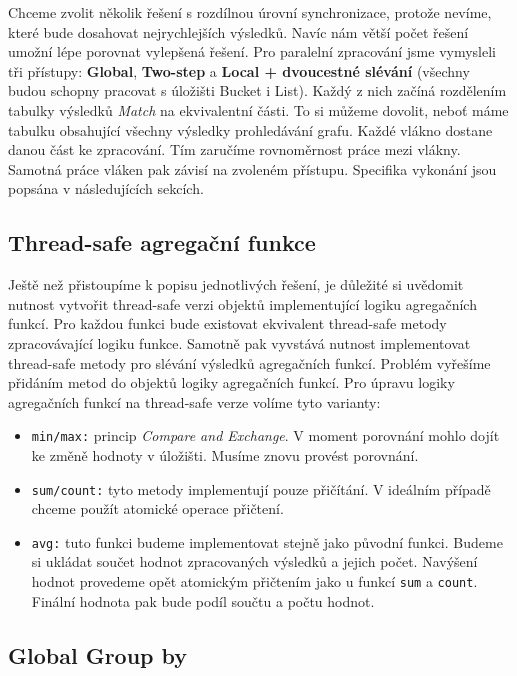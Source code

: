 Chceme zvolit několik řešení s rozdílnou úrovní synchronizace, protože nevíme, které bude dosahovat nejrychlejších výsledků.
Navíc nám větší počet řešení umožní lépe porovnat vylepšená řešení.
Pro paralelní zpracování jsme vymysleli tři přístupy: \textbf{Global}, \textbf{Two-step} a \textbf{Local + dvoucestné slévání} (všechny budou schopny pracovat s úložišti Bucket i List).
Každý z nich začíná rozdělením tabulky výsledků \textit{Match} na ekvivalentní části.
To si můžeme dovolit, neboť máme tabulku obsahující všechny výsledky prohledávání grafu.
Každé vlákno dostane danou část ke zpracování.
Tím zaručíme rovnoměrnost práce mezi vlákny.
Samotná práce vláken pak závisí na zvoleném přístupu.
Specifika vykonání jsou popsána v následujících sekcích.

\subsection{Thread-safe agregační funkce}

Ještě než přistoupíme k popisu jednotlivých řešení, je důležité si uvědomit nutnost vytvořit thread-safe verzi objektů implementující logiku agregačních funkcí.
Pro každou funkci bude existovat ekvivalent thread-safe metody zpracovávající logiku funkce.
Samotně pak vyvstává nutnost implementovat thread-safe metody pro slévání výsledků agregačních funkcí.
Problém vyřešíme přidáním metod do objektů logiky agregačních funkcí.
Pro úpravu logiky agregačních funkcí na thread-safe verze volíme tyto varianty:

\begin{itemize}

\item \texttt{min/max:} princip \textit{Compare and Exchange}. V moment porovnání mohlo dojít ke změně hodnoty v úložišti.
Musíme znovu provést porovnání.  

\item \texttt{sum/count:} tyto metody implementují pouze přičítání. 
V ideálním případě chceme použít atomické operace přičtení.
 
\item \texttt{avg:} tuto funkci budeme implementovat stejně jako původní funkci. 
Budeme si ukládat součet hodnot zpracovaných výsledků a jejich počet.
Navýšení hodnot provedeme opět atomickým přičtením jako u funkcí \texttt{sum} a \texttt{count}.
Finální hodnota pak bude podíl součtu a počtu hodnot.
\end{itemize}

\subsection{Global Group by} \label{anal.groupby.global}

